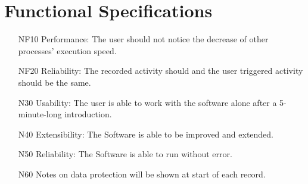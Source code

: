 \chapter{Functional Specifications}
\label{ch:func}

\begin{itemize}
    \item[NF10] Performance: The user should not notice the decrease of other processes' execution speed.
    \item[NF20] Reliability: The recorded activity should and the user triggered activity should be the same.
    \item[N30]  Usability: The user is able to work with the software alone after a 5-minute-long introduction.
    \item[N40] Extensibility: The Software is able to be improved and extended.
    \item[N50] Reliability: The Software is able to run without error. %
    \item[N60] Notes on data protection will be shown at start of each record. %
    
\end{itemize}